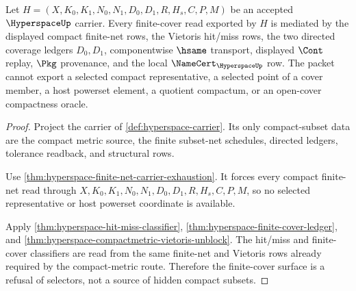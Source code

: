 \begin{theorem}
\label{thm:hyperspace-finite-cover-selector-refusal}
Let $H=(X,K_0,K_1,N_0,N_1,D_0,D_1,R,H_s,C,P,M)$ be an accepted $\HyperspaceUp$ carrier. Every finite-cover read exported by $H$ is mediated by the displayed compact finite-net rows, the Vietoris hit/miss rows, the two directed coverage ledgers $D_0,D_1$, componentwise $\hsame$ transport, displayed $\Cont$ replay, $\Pkg$ provenance, and the local $\NameCert_{\HyperspaceUp}$ row. The packet cannot export a selected compact representative, a selected point of a cover member, a host powerset element, a quotient compactum, or an open-cover compactness oracle.
\end{theorem}
\begin{proof}
Project the carrier of \autoref{def:hyperspace-carrier}. Its only compact-subset data are the compact metric source, the finite subset-net schedules, directed ledgers, tolerance readback, and structural rows.

Use \autoref{thm:hyperspace-finite-net-carrier-exhaustion}. It forces every compact finite-net read through $X,K_0,K_1,N_0,N_1,D_0,D_1,R,H_s,C,P,M$, so no selected representative or host powerset coordinate is available.

Apply \autoref{thm:hyperspace-hit-miss-classifier}, \autoref{thm:hyperspace-finite-cover-ledger}, and \autoref{thm:hyperspace-compactmetric-vietoris-unblock}. The hit/miss and finite-cover classifiers are read from the same finite-net and Vietoris rows already required by the compact-metric route. Therefore the finite-cover surface is a refusal of selectors, not a source of hidden compact subsets.
\end{proof}



